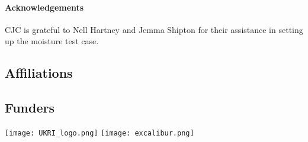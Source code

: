 \documentclass[
]{ImperialPoster}
\begin{document}
\begin{multicols}{3}
\vspace{-5mm}
\paragraph{Acknowledgements} CJC is grateful to Nell Hartney and Jemma Shipton for their assistance in setting up the moisture test case.

\AtNextBibliography{\small} \printbibliography
        
\subsection{Affiliations}

	
\subsection{Funders}

\texttt{[image: UKRI\_logo.png]} %
\texttt{[image: excalibur.png]} %
	

\end{multicols}

\end{document}
